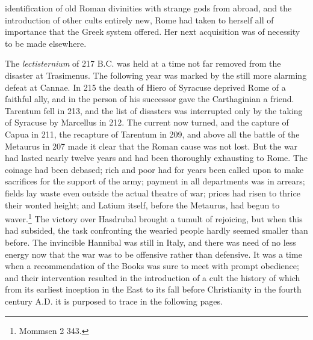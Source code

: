 \documentclass[a4paper, 11pt, oneside, polutonikogreek, english]{article}
\begin{document}
identification of old Roman divinities with strange gods from abroad, and the introduction of other cults entirely new, Rome had taken to herself all of importance that the Greek system offered. Her next acquisition was of necessity to be made elsewhere.

The \emph{lectisternium} of 217 \textsc{B.C.} was held at a time not far removed from the disaster at Trasimenus. The following year was marked by the still more alarming defeat at Cannae. In 215 the death of Hiero of Syracuse deprived Rome of a faithful ally, and in the person of his successor gave the Carthaginian a friend. Tarentum fell in 213, and the list of disasters was interrupted only by the taking of Syracuse by Marcellus in 212. The current now turned, and the capture of Capua in 211, the recapture of Tarentum in 209, and above all the battle of the Metaurus in 207 made it clear that the Roman cause was not lost. But the war had lasted nearly twelve years and had been thoroughly exhausting to Rome. The coinage had been debased; rich and poor had for years been called upon to make sacrifices for the support of the army; payment in all departments was in arrears; fields lay waste even outside the actual theatre of war; prices had risen to thrice their wonted height; and Latium itself, before the Metaurus, had begun to waver.\footnote{Mommsen 2 343.} The victory over Hasdrubal brought a tumult of rejoicing, but when this had subsided, the task confronting the wearied people hardly seemed smaller than before. The invincible Hannibal was still in Italy, and there was need of no less energy now that the war was to be offensive rather than defensive. It was a time when a recommendation of the Books was sure to meet with prompt obedience; and their intervention resulted in the introduction of a cult the history of which from its earliest inception in the East to its fall before Christianity in the fourth century \textsc{A.D.} it is purposed to trace in the following pages.
\end{document}
